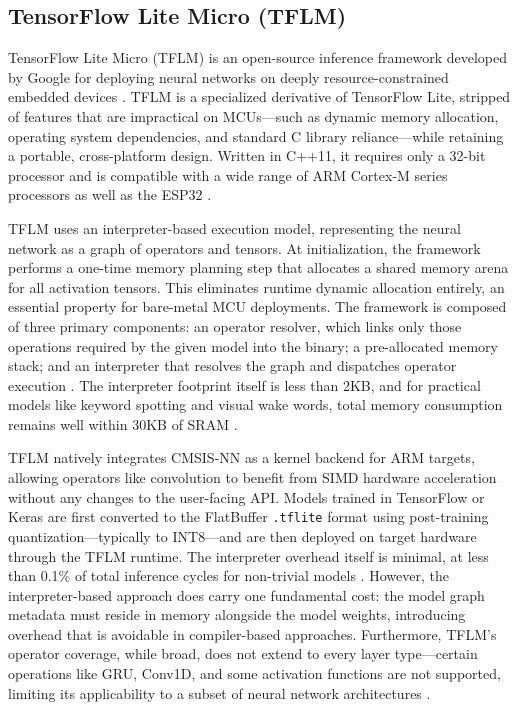 \documentclass[conference]{IEEEtran}
\begin{document}
	\subsection{TensorFlow Lite Micro (TFLM)}
	
	TensorFlow Lite Micro (TFLM) is an open-source inference framework developed by Google for deploying neural networks on deeply resource-constrained embedded devices \cite{tflm2021}. TFLM is a specialized derivative of TensorFlow Lite, stripped of features that are impractical on MCUs—such as dynamic memory allocation, operating system dependencies, and standard C library reliance—while retaining a portable, cross-platform design. Written in C++11, it requires only a 32-bit processor and is compatible with a wide range of ARM Cortex-M series processors as well as the ESP32 \cite{tflm2021}.
	
	TFLM uses an interpreter-based execution model, representing the neural network as a graph of operators and tensors. At initialization, the framework performs a one-time memory planning step that allocates a shared memory arena for all activation tensors. This eliminates runtime dynamic allocation entirely, an essential property for bare-metal MCU deployments. The framework is composed of three primary components: an operator resolver, which links only those operations required by the given model into the binary; a pre-allocated memory stack; and an interpreter that resolves the graph and dispatches operator execution \cite{tflm2021}. The interpreter footprint itself is less than 2KB, and for practical models like keyword spotting and visual wake words, total memory consumption remains well within 30KB of SRAM \cite{tflm2021}.
	
	TFLM natively integrates CMSIS-NN as a kernel backend for ARM targets, allowing operators like convolution to benefit from SIMD hardware acceleration without any changes to the user-facing API. Models trained in TensorFlow or Keras are first converted to the FlatBuffer \texttt{.tflite} format using post-training quantization—typically to INT8—and are then deployed on target hardware through the TFLM runtime. The interpreter overhead itself is minimal, at less than 0.1\% of total inference cycles for non-trivial models \cite{tflm2021}. However, the interpreter-based approach does carry one fundamental cost: the model graph metadata must reside in memory alongside the model weights, introducing overhead that is avoidable in compiler-based approaches. Furthermore, TFLM's operator coverage, while broad, does not extend to every layer type—certain operations like GRU, Conv1D, and some activation functions are not supported, limiting its applicability to a subset of neural network architectures \cite{efficientnnsreview2023}.
	
\end{document}
